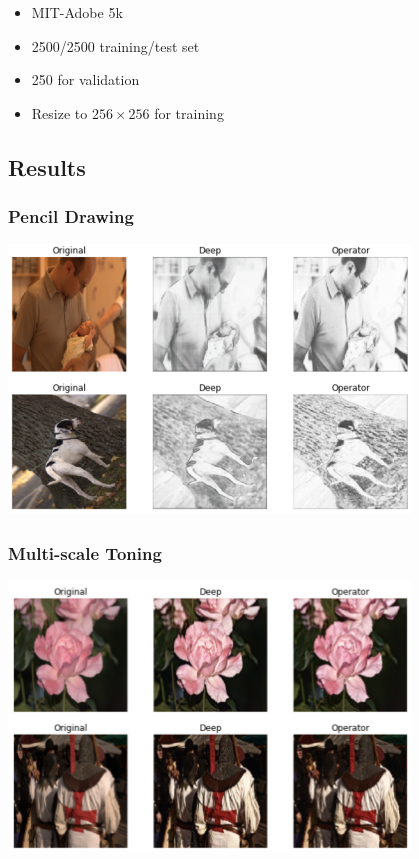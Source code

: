 \documentclass{article}
\begin{document}
\begin{itemize}
    \item MIT-Adobe 5k
    \item 2500/2500 training/test set
    \item 250 for validation
    \item Resize to $256 \times 256$ for training
\end{itemize}

\subsection*{Results}

\subsubsection*{Pencil Drawing}

\begin{center}
\includegraphics[width=0.8\textwidth]{img/1.png}
\end{center}

\subsubsection*{Multi-scale Toning}

\begin{center}
\includegraphics[width=0.8\textwidth]{img/2.png}
\end{center}
\end{document}
